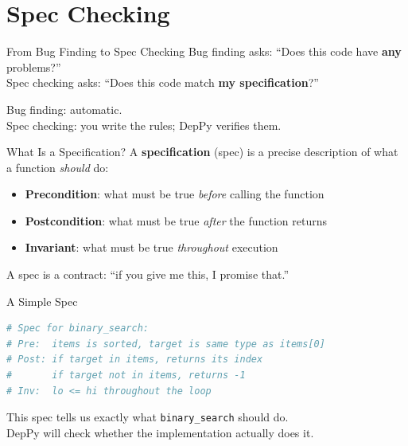 \documentclass[aspectratio=169,10pt]{beamer}
\newcommand{\hint}[1]{\begin{center}
  \colorbox{hintbg}{\parbox{0.88\textwidth}{\centering\small #1}}\end{center}}
\begin{document}
\section{Spec Checking}

\begin{frame}{From Bug Finding to Spec Checking}
Bug finding asks: ``Does this code have \textbf{any} problems?''\\[0.3em]
Spec checking asks: ``Does this code match \textbf{my specification}?''
\vspace{0.5em}
\begin{center}
Bug finding: automatic.\\
Spec checking: you write the rules; DepPy verifies them.
\end{center}
\end{frame}

\begin{frame}{What Is a Specification?}
A \textbf{specification} (spec) is a precise description of what a function \emph{should} do:
\vspace{0.3em}
\begin{itemize}
  \item \textbf{Precondition}: what must be true \emph{before} calling the function
  \item \textbf{Postcondition}: what must be true \emph{after} the function returns
  \item \textbf{Invariant}: what must be true \emph{throughout} execution
\end{itemize}
\vspace{0.3em}
\hint{A spec is a contract: ``if you give me this, I promise that.''}
\end{frame}

\begin{frame}[fragile]{A Simple Spec}
\begin{lstlisting}[language=Python, basicstyle=\ttfamily\scriptsize]
# Spec for binary_search:
# Pre:  items is sorted, target is same type as items[0]
# Post: if target in items, returns its index
#       if target not in items, returns -1
# Inv:  lo <= hi throughout the loop
\end{lstlisting}
\vspace{0.3em}
This spec tells us exactly what \texttt{binary\_search} should do.\\
DepPy will check whether the implementation actually does it.
\end{frame}
\end{document}
